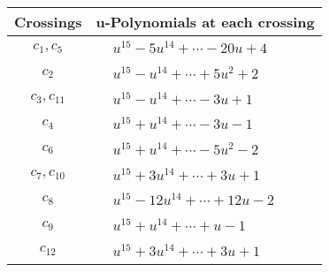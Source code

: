 \documentclass[1p]{elsarticle_modified}
\theoremstyle{definition}
\begin{document}
\begin{tabular}{m{50pt}|m{274pt}}
Crossings & \hspace{64pt}u-Polynomials at each crossing \\
\hline $$\begin{aligned}c_{1},c_{5}\end{aligned}$$&$\begin{aligned}
&u^{15}-5 u^{14}+\cdots-20 u+4
\end{aligned}$\\
\hline $$\begin{aligned}c_{2}\end{aligned}$$&$\begin{aligned}
&u^{15}- u^{14}+\cdots+5 u^2+2
\end{aligned}$\\
\hline $$\begin{aligned}c_{3},c_{11}\end{aligned}$$&$\begin{aligned}
&u^{15}- u^{14}+\cdots-3 u+1
\end{aligned}$\\
\hline $$\begin{aligned}c_{4}\end{aligned}$$&$\begin{aligned}
&u^{15}+u^{14}+\cdots-3 u-1
\end{aligned}$\\
\hline $$\begin{aligned}c_{6}\end{aligned}$$&$\begin{aligned}
&u^{15}+u^{14}+\cdots-5 u^2-2
\end{aligned}$\\
\hline $$\begin{aligned}c_{7},c_{10}\end{aligned}$$&$\begin{aligned}
&u^{15}+3 u^{14}+\cdots+3 u+1
\end{aligned}$\\
\hline $$\begin{aligned}c_{8}\end{aligned}$$&$\begin{aligned}
&u^{15}-12 u^{14}+\cdots+12 u-2
\end{aligned}$\\
\hline $$\begin{aligned}c_{9}\end{aligned}$$&$\begin{aligned}
&u^{15}+u^{14}+\cdots+u-1
\end{aligned}$\\
\hline $$\begin{aligned}c_{12}\end{aligned}$$&$\begin{aligned}
&u^{15}+3 u^{14}+\cdots+3 u+1
\end{aligned}$\\
\hline
\end{tabular}\\~\\
\end{document}
